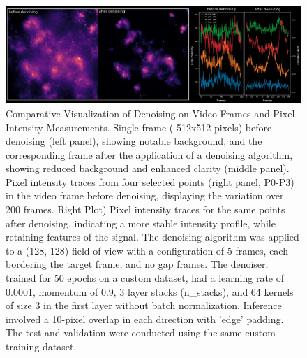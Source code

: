 \begin{figure}[h!]
    \begin{center}
        \includegraphics[width=\linewidth]{figures/3.png}
    \end{center}
    \caption{Comparative Visualization of Denoising on Video Frames and Pixel Intensity Measurements. Single frame (
        512x512 pixels) before denoising (left panel), showing notable background, and the corresponding frame after
        the application of a denoising algorithm, showing reduced background and enhanced clarity (middle panel).
        Pixel intensity traces from four selected points (right panel, P0-P3) in the video frame before denoising,
        displaying the variation over 200 frames. Right Plot) Pixel intensity traces for the same points after
        denoising, indicating a more stable intensity profile, while retaining features of the signal. The denoising
        algorithm was applied to a (128, 128) field of view with a configuration of 5 frames, each bordering the
        target frame, and no gap frames. The denoiser, trained for 50 epochs on a custom dataset, had a learning rate
        of 0.0001, momentum of 0.9, 3 layer stacks (n\_stacks), and 64 kernels of size 3 in the first layer without
        batch normalization. Inference involved a 10-pixel overlap in each direction with 'edge' padding. The test
        and validation were conducted using the same custom training dataset.
    }\label{fig:3}
\end{figure}

